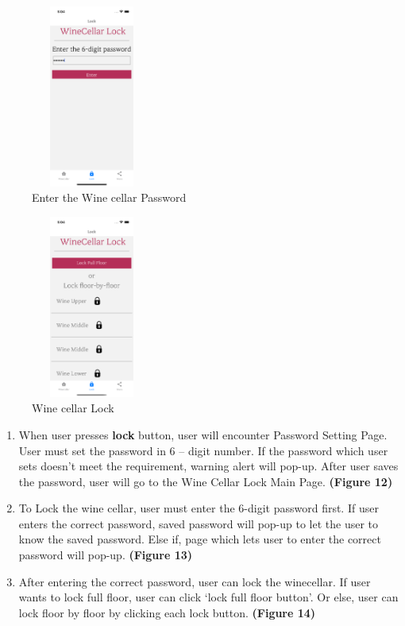 \documentclass[sigconf, nonacm]{acmart}
\begin{document}
\begin{figure}
  \centering
  \includegraphics[width=4cm, height=6cm]{4. Passwd Confirmation.png}
  \caption{Enter the Wine cellar Password}
  \label{fig:wine cellar password }
\end{figure}
\clearpage

\begin{figure}
  \centering
  \includegraphics[width=4cm, height=6cm]{5. ViewingCellarTrytoLock.png}
  \caption{Wine cellar Lock}
  \label{fig:wine cellar lock}
\end{figure}

\begin{enumerate}
    \item When user presses \textbf{lock} button, user will encounter Password Setting Page. User must set the password in 6 – digit number. If the password which user sets doesn’t meet the requirement, warning alert will pop-up. After user saves the password, user will go to the Wine Cellar Lock Main Page.  \textbf{(Figure 12)}
    \item To Lock the wine cellar, user must enter the 6-digit password first. If user enters the correct password, saved password will pop-up to let the user to know the saved password. Else if, page which lets user to enter the correct password will pop-up.  \textbf{(Figure 13)}
    \item After entering the correct password, user can lock the winecellar.  If user wants to lock full floor, user can click
‘lock full floor button’. Or else, user can lock floor by
floor by clicking each lock button. \textbf{(Figure 14)}
\end{enumerate}
\end{document}
